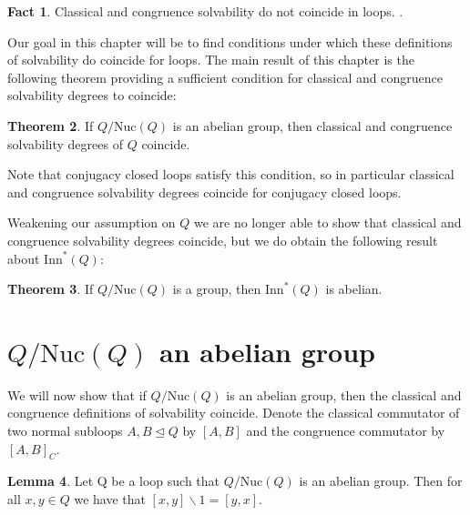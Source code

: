 \documentclass[12pt]{report}
\theoremstyle{definition}
\newtheorem{thm}{Theorem}[chapter]
\newtheorem{fct}[thm]{Fact}
\newtheorem{lem}[thm]{Lemma}
\newcommand{\ldv}{\backslash}       %
\newcommand{\nuc}{\text{Nuc}}       %
\newcommand{\inn}{\text{Inn}}       %
\begin{document}
\begin{fct}
  Classical and congruence solvability do not coincide in loops. \cite{ComTheory}.
\end{fct}

Our goal in this chapter will be to find conditions under which these definitions of solvability
  do coincide for loops. The main result of this chapter is the following theorem providing a
  sufficient condition for classical and congruence solvability degrees to coincide: 

\begin{thm}
  If $Q/\nuc(Q)$ is an abelian group, then classical and congruence solvability degrees of $Q$ coincide.
\end{thm}

Note that conjugacy closed loops satisfy this condition, so in particular classical and congruence solvability degrees coincide
  for conjugacy closed loops.

Weakening our assumption on $Q$ we are no longer able to show that classical and congruence
  solvability degrees coincide, but we do obtain the following result about $\inn^*(Q)$:

\begin{thm}
  If $Q/\nuc(Q)$ is a group, then $\inn^*(Q)$ is abelian.
\end{thm}


\section{$Q/\nuc(Q)$ an abelian group}
\label{sec:nucVar}

We will now show that if $Q/\nuc(Q)$ is an abelian group, then the classical and congruence definitions
  of solvability coincide. Denote the classical commutator of two normal subloops $A, B\unlhd Q$ by
  $[A, B]$ and the congruence commutator by $[A, B]_C$.

\begin{lem}\label{lem-1}
  Let Q be a loop such that $Q/\nuc(Q)$ is an abelian group. Then for all $x, y\in Q$ we have
    that $[x, y]\ldv 1 = [y, x]$.
\end{lem}
\end{document}
